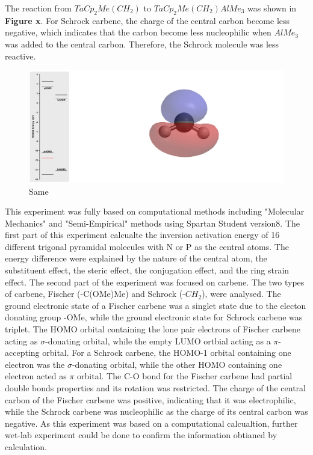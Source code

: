 \documentclass[twocolumn]{article} %
\begin{document}
The reaction from $TaCp_2Me(CH_2)$ to $TaCp_2Me(CH_2)AlMe_3$ was shown in \textbf{Figure x}. For Schrock carbene, the charge of the central carbon become less negative, which indicates that the carbon become less nucleophilic when $AlMe_3$ was added to the central carbon. Therefore, the Schrock molecule was less reactive. 

\begin{figure}[h!]
      \centering
      \includegraphics[width=0.95\columnwidth]{CH2 HOMO-1.png} %
      \vspace{2mm} %
      \caption{Same}
\end{figure}

This experiment was fully based on computational methods including "Molecular Mechanics" and "Semi-Empirical" methods using Spartan Student version8. The first part of this experiment calcualte the inversion activation energy of 16 different trigonal pyramidal molecules with N or P as the central atoms. The energy difference were explained by the nature of the central atom, the substituent effect, the steric effect, the conjugation effect, and the ring strain effect. The second part of the experiment was focused on carbene. The two types of carbene, Fischer (-C(OMe)Me) and Schrock (-$CH_2$), were analysed. The ground electronic state of a Fischer carbene was a singlet state due to the electon donating group -OMe, while the ground electronic state for Schrock carbene was triplet. The HOMO orbital containing the lone pair electrons of Fischer carbene acting as $\sigma$-donating orbital, while the empty LUMO ortbial acting as a $\pi$-accepting orbital. For a Schrock carbene, the HOMO-1 orbital containing one electron was the $\sigma$-donating orbital, while the other HOMO containing one electron acted as $\pi$ orbital. The C-O bond for the Fischer carbene had partial double bonds properties and its rotation was restricted. The charge of the central carbon of the Fischer carbene was positive, indicating that it was electrophilic, while the Schrock carbene was nucleophilic as the charge of its central carbon was negative. As this experiment was based on a computational calcualtion, further wet-lab experiment could be done to confirm the information obtianed by calculation.
\end{document}
